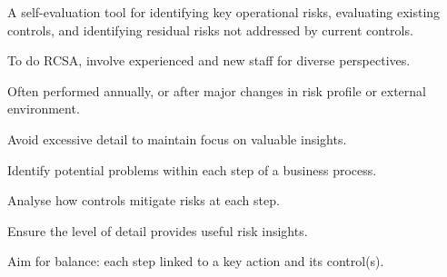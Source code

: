 
\begin{lettered}
\item A self-evaluation tool for identifying key operational risks, evaluating
existing controls, and identifying residual risks not addressed by current
controls.
\item To do RCSA, involve experienced and new staff for diverse perspectives.
\item Often performed annually, or after major changes in risk profile or
external environment.
\item Avoid excessive detail to maintain focus on valuable insights.
\end{lettered}


\begin{lettered}
\item Identify potential problems within each step of a business process.
\item Analyse how controls mitigate risks at each step.
\item Ensure the level of detail provides useful risk insights.
\item Aim for balance: each step linked to a key action and its control(s).
\end{lettered}



